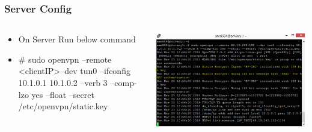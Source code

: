 \documentclass{beamer}
\begin{document}
\begin{frame}
\frametitle{Server Config}
\begin{columns}
    \begin{column}{0.48\textwidth}
	\begin{itemize}
	\item On Server Run below command\\
	\item \# sudo openvpn --remote \textless clientIP\textgreater  --dev tun0 --ifconfig 10.1.0.1 10.1.0.2 --verb 3 --comp-lzo yes --float --secret /etc/openvpn/static.key
        \end{itemize}
    \end{column}
    \begin{column}{.5\textwidth}
        \includegraphics[width=.9\linewidth]{am1}
    \end{column}
\end{columns}
\end{frame}
\end{document}
